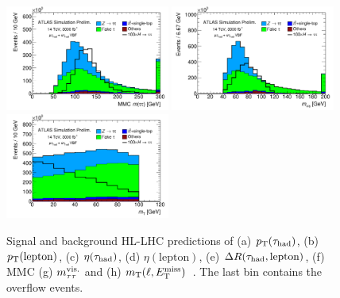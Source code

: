 \begin{figure}[tp]
  \includegraphics[width=0.48\textwidth]{figures/ATL-PHYS-PUB-2014-018/fig_04f}
  \includegraphics[width=0.48\textwidth]{figures/ATL-PHYS-PUB-2014-018/fig_04g}
  \includegraphics[width=0.48\textwidth]{figures/ATL-PHYS-PUB-2014-018/fig_04h}
  \caption{Signal and background HL-LHC predictions of (a) $p_{\mathrm{T}}(\tau_\text{had})$, (b) $p_{\mathrm{T}}(\text{lepton})$, (c) $\eta(\tauh)$, (d) $\eta(\text{lepton})$, (e) $\Delta R(\tau_\text{had}, \text{lepton})$, (f) MMC (g) $m_{\tau\tau}^\text{vis.}$ and (h) $m_\text{T}(\ell, E_{\mathrm{T}}^{\mathrm{miss}})$~\cite{ATL-PHYS-PUB-2014-018}. The last bin contains the overflow events.}
  \label{fig:prospects-hllhc-taus}
\end{figure}

